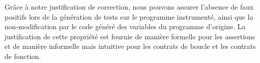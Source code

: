 Grâce à notre justification de correction, nous pouvons assurer l'absence de
faux positifs lors de la génération de tests sur le programme instrumenté, ainsi
que la non-modification par le code généré des variables du programme d'origine.
La justification de cette propriété est fournie de manière formelle pour les
assertions et de manière informelle mais intuitive pour les contrats de boucle
et les contrats de fonction.








